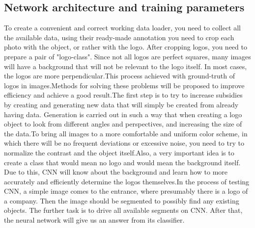 \subsection{Network architecture and training parameters}\label{sec:4.2.2}
\vspace{-0.5cm}
\noindent To create a convenient and correct working data loader, you need to collect all the available data, using their ready-made annotation you need to crop each photo with the object, or rather with the logo. After cropping logos, you need to prepare a pair of "logo-class". Since not all logos are perfect squares, many images will have a background that will not be relevant to the logo itself. In most cases, the logos are more perpendicular.This process achieved with ground-truth of logos in images.Methods for solving these problems will be proposed to improve efficiency and achieve a good result.The first step is to try to increase subsidies by creating and generating new data that will simply be created from already having data. Generation is carried out in such a way that when creating a logo object to look from different angles and perspectives, and increasing the size of the data.To bring all images to a more comfortable and uniform color scheme, in which there will be no frequent deviations or excessive noise, you need to try to normalize the contrast and the object itself.Also, a very important idea is to create a class that would mean no logo and would mean the background itself. Due to this, CNN will know about the background and learn how to more accurately and efficiently determine the logos themselves.In the process of testing CNN, a simple image comes to the entrance, where presumably there is a logo of a company. Then the image should be segmented to possibly find any existing objects. The further task is to drive all available segments on CNN. After that, the neural network will give us an answer from its classifier.

